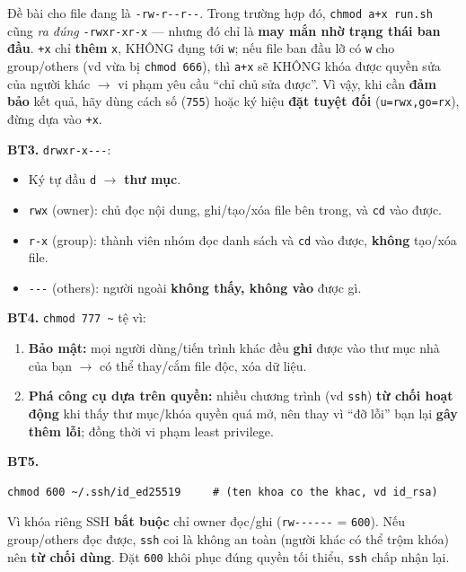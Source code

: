 \documentclass[12pt,a4paper]{article}
\newcommand{\cmd}[1]{\texttt{#1}}
\begin{document}
\begin{notebox}
Đề bài cho file đang là \cmd{-rw-r-{}-r-{}-}. Trong trường hợp đó, \cmd{chmod a+x
run.sh} cũng \textit{ra đúng} \cmd{-rwxr-xr-x} --- nhưng đó chỉ là \textbf{may mắn nhờ
trạng thái ban đầu}. \cmd{+x} chỉ \textbf{thêm} \cmd{x}, KHÔNG đụng tới \cmd{w}; nếu
file ban đầu lỡ có \cmd{w} cho group/others (vd vừa bị \cmd{chmod 666}), thì \cmd{a+x}
sẽ KHÔNG khóa được quyền sửa của người khác $\rightarrow$ vi phạm yêu cầu ``chỉ chủ sửa được''.
Vì vậy, khi cần \textbf{đảm bảo} kết quả, hãy dùng cách số (\cmd{755}) hoặc ký hiệu
\textbf{đặt tuyệt đối} (\cmd{u=rwx,go=rx}), đừng dựa vào \cmd{+x}.
\end{notebox}

\textbf{BT3.} \cmd{drwxr-x-{}-{}-}:
\begin{itemize}
\item Ký tự đầu \cmd{d} $\rightarrow$ \textbf{thư mục}.
\item \cmd{rwx} (owner): chủ đọc nội dung, ghi/tạo/xóa file bên trong, và \cmd{cd}
  vào được.
\item \cmd{r-x} (group): thành viên nhóm đọc danh sách và \cmd{cd} vào được,
  \textbf{không} tạo/xóa file.
\item \cmd{-{}-{}-} (others): người ngoài \textbf{không thấy, không vào} được gì.
\end{itemize}

\textbf{BT4.} \cmd{chmod 777 \textasciitilde} tệ vì:
\begin{enumerate}
\item \textbf{Bảo mật:} mọi người dùng/tiến trình khác đều \textbf{ghi} được vào thư
  mục nhà của bạn $\rightarrow$ có thể thay/cắm file độc, xóa dữ liệu.
\item \textbf{Phá công cụ dựa trên quyền:} nhiều chương trình (vd \cmd{ssh})
  \textbf{từ chối hoạt động} khi thấy thư mục/khóa quyền quá mở, nên thay vì ``đỡ
  lỗi'' bạn lại \textbf{gây thêm lỗi}; đồng thời vi phạm least privilege.
\end{enumerate}

\textbf{BT5.}
\begin{Verbatim}
chmod 600 ~/.ssh/id_ed25519     # (ten khoa co the khac, vd id_rsa)
\end{Verbatim}
Vì khóa riêng SSH \textbf{bắt buộc} chỉ owner đọc/ghi (\cmd{rw-{}-{}-{}-{}-{}-} =
\cmd{600}). Nếu group/others đọc được, \cmd{ssh} coi là không an toàn (người khác có
thể trộm khóa) nên \textbf{từ chối dùng}. Đặt \cmd{600} khôi phục đúng quyền tối
thiểu, \cmd{ssh} chấp nhận lại.
\end{document}
